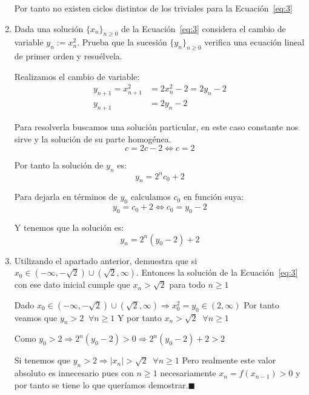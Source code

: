 \documentclass[12pt]{article}
\begin{document}
\begin{ejercicio}[4 puntos]
\begin{enumerate}
	Por tanto no existen ciclos distintos de los triviales para la Ecuación~\ref{eq:3}
	\item Dada una solución $\{x_n\}_{n\geq 0}$ de la Ecuación~\ref{eq:3} considera el cambio de variable $y_n := x_n^2$. Prueba que la sucesión $\{y_n\}_{n\geq 0}$ verifica una ecuación lineal de primer orden y resuélvela.
	
	Realizamos el cambio de variable:
	\begin{align*}
	y_{n+1}=x_{n+1}^2&=2x_n^2-2=2y_n-2\\
	y_{n+1} &= 2y_n-2
	\end{align*}
	
	Para resolverla buscamos una solución particular, en este caso constante nos sirve y la solución de su parte homogénea.
	\[c=2c-2 \iff c=2\]
	
	Por tanto la solución de $y_n$ es:
	\[y_n=2^nc_0 + 2\]
	
	Para dejarla en términos de $y_0$ calculamos $c_0$ en función suya:
	\[y_0=c_0+2\iff c_0=y_0-2\]
	
	Y tenemos que la solución es:
	\[y_n=2^n(y_0-2) + 2\]
	
	\item Utilizando el apartado anterior, demuestra que si $x_0\in (-\infty,-\sqrt{2})\cup(\sqrt{2},\infty)$. Entonces la solución de la Ecuación~\ref{eq:3} con ese dato inicial cumple que $x_n > \sqrt{2}$ para todo $n\geq 1$
	
	Dado $x_0\in (-\infty,-\sqrt{2})\cup(\sqrt{2},\infty) \Rightarrow x_0^2=y_0\in(2,\infty)$ Por tanto veamos que $y_n>2\;\; \forall n\geq 1$ Y por tanto $x_n>\sqrt{2}\;\;\forall n\geq 1$
	
	Como $y_0 > 2 \Rightarrow 2^n(y_0-2) > 0 \Rightarrow 2^n(y_0-2)+2 > 2$
	
	Si tenemos que $y_n > 2 \Rightarrow |x_n| > \sqrt{2}\;\; \forall n\geq 1$ Pero realmente este valor absoluto es innecesario pues con $n\geq 1$ necesariamente $x_n=f(x_{n-1}) > 0$ y por tanto se tiene lo que queríamos demostrar.\hfill $\blacksquare$
	\end{enumerate}
    \end{ejercicio}
\end{document}
